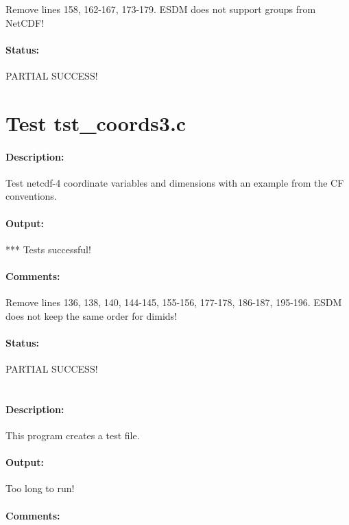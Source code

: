 Remove lines 158, 162-167, 173-179. ESDM does not support groups from NetCDF!

\paragraph{Status:} PARTIAL SUCCESS!

\section{Test tst\_coords3.c}

\paragraph{Description:} Test netcdf-4 coordinate variables and dimensions with an example from the CF conventions.

\paragraph{Output:} *** Tests successful!

\paragraph{Comments:} Remove lines 136, 138, 140, 144-145, 155-156, 177-178, 186-187, 195-196. ESDM does not keep the same order for dimids!

\paragraph{Status:} PARTIAL SUCCESS!

\section{{\color{blue}{FIX ME! Test tst\_create\_files.c}}}

\paragraph{Description:} This program creates a test file.

\paragraph{Output:} Too long to run!

\paragraph{Comments:}

